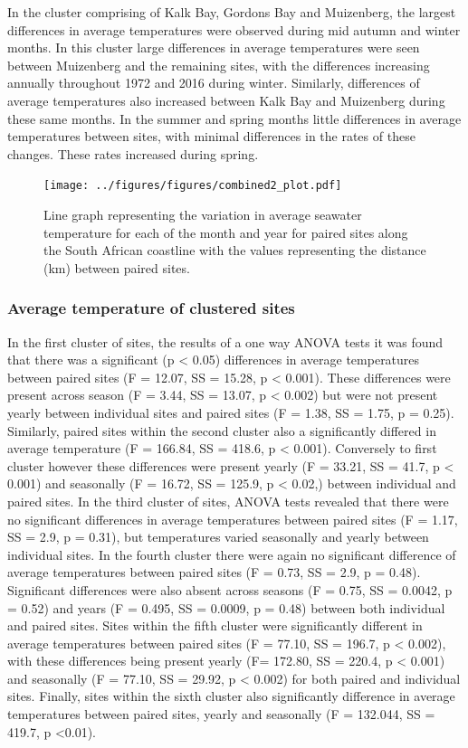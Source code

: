 \documentclass[12pt,A4paper,]{article}
\begin{document}
In the cluster comprising of Kalk Bay, Gordons Bay and Muizenberg, the
largest differences in average temperatures were observed during mid
autumn and winter months. In this cluster large differences in average
temperatures were seen between Muizenberg and the remaining sites, with
the differences increasing annually throughout 1972 and 2016 during
winter. Similarly, differences of average temperatures also increased
between Kalk Bay and Muizenberg during these same months. In the summer
and spring months little differences in average temperatures between
sites, with minimal differences in the rates of these changes. These
rates increased during spring.

\begin{figure}
\centering
\texttt{[image: ../figures/figures/combined2\_plot.pdf]}
\caption{Line graph representing the variation in average seawater
temperature for each of the month and year for paired sites along the
South African coastline with the values representing the distance (km)
between paired sites.}
\end{figure}

\subsubsection{Average temperature of clustered
sites}\label{average-temperature-of-clustered-sites}

In the first cluster of sites, the results of a one way ANOVA tests it
was found that there was a significant (p \textless{} 0.05) differences
in average temperatures between paired sites (F = 12.07, SS = 15.28, p
\textless{} 0.001). These differences were present across season (F =
3.44, SS = 13.07, p \textless{} 0.002) but were not present yearly
between individual sites and paired sites (F = 1.38, SS = 1.75, p =
0.25). Similarly, paired sites within the second cluster also a
significantly differed in average temperature (F = 166.84, SS = 418.6, p
\textless{} 0.001). Conversely to first cluster however these
differences were present yearly (F = 33.21, SS = 41.7, p \textless{}
0.001) and seasonally (F = 16.72, SS = 125.9, p \textless{} 0.02,)
between individual and paired sites. In the third cluster of sites,
ANOVA tests revealed that there were no significant differences in
average temperatures between paired sites (F = 1.17, SS = 2.9, p =
0.31), but temperatures varied seasonally and yearly between individual
sites. In the fourth cluster there were again no significant difference
of average temperatures between paired sites (F = 0.73, SS = 2.9, p =
0.48). Significant differences were also absent across seasons (F =
0.75, SS = 0.0042, p = 0.52) and years (F = 0.495, SS = 0.0009, p =
0.48) between both individual and paired sites. Sites within the fifth
cluster were significantly different in average temperatures between
paired sites (F = 77.10, SS = 196.7, p \textless{} 0.002), with these
differences being present yearly (F= 172.80, SS = 220.4, p \textless{}
0.001) and seasonally (F = 77.10, SS = 29.92, p \textless{} 0.002) for
both paired and individual sites. Finally, sites within the sixth
cluster also significantly difference in average temperatures between
paired sites, yearly and seasonally (F = 132.044, SS = 419.7, p
\textless{}0.01).
\end{document}
